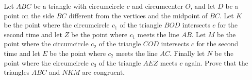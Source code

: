 Let $ABC$ be a triangle with circumcircle $c$ and circumcenter $O$, and let $D$ be a point on the side $BC$ different from the vertices and the midpoint of $BC$. Let $K$ be the point where the circumcircle $c_1$ of the triangle $BOD$ intersects $c$ for the second time and let $Z$ be the point where $c_1$ meets the line $AB$. Let $M$ be the point where the circumcircle $c_2$ of the triangle $COD$ intersects $c$ for the second time and let $E$ be the point where $c_2$ meets the line $AC$. Finally let $N$ be the point where the circumcircle $c_3$ of the triangle $AEZ$ meets $c$ again. Prove that the triangles $ABC$ and $NKM$ are congruent.